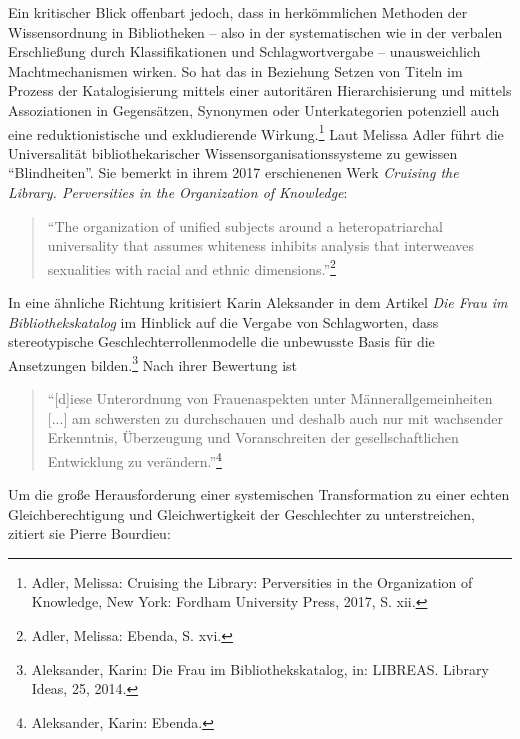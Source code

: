 \documentclass[a4paper,
fontsize=11pt,
oneside,
numbers=noperiodatend,
parskip=half-,
bibliography=totoc,
final
]{scrartcl}
\begin{document}
Ein kritischer Blick offenbart jedoch, dass in herkömmlichen Methoden
der Wissensordnung in Bibliotheken -- also in der systematischen wie in
der verbalen Erschließung durch Klassifikationen und Schlagwortvergabe
-- unausweichlich Machtmechanismen wirken. So hat das in Beziehung
Setzen von Titeln im Prozess der Katalogisierung mittels einer
autoritären Hierarchisierung und mittels Assoziationen in Gegensätzen,
Synonymen oder Unterkategorien potenziell auch eine reduktionistische
und exkludierende Wirkung.\footnote{Adler, Melissa: Cruising the
  Library: Perversities in the Organization of Knowledge, New York:
  Fordham University Press, 2017, S. xii.} Laut Melissa Adler führt die
Universalität bibliothekarischer Wissensorganisationssysteme zu gewissen
\enquote{Blindheiten}. Sie bemerkt in ihrem 2017 erschienenen Werk
\emph{Cruising the Library. Perversities in the Organization of
Knowledge}:

\begin{quote}
\enquote{The organization of unified subjects around a heteropatriarchal
universality that assumes whiteness inhibits analysis that interweaves
sexualities with racial and ethnic dimensions.}\footnote{Adler, Melissa:
  Ebenda, S. xvi.}
\end{quote}

In eine ähnliche Richtung kritisiert Karin Aleksander in dem Artikel
\emph{Die Frau im Bibliothekskatalog} im Hinblick auf die Vergabe von
Schlagworten, dass stereotypische Geschlechterrollenmodelle die
unbewusste Basis für die Ansetzungen bilden.\footnote{Aleksander, Karin:
  Die Frau im Bibliothekskatalog, in: LIBREAS. Library Ideas, 25, 2014.}
Nach ihrer Bewertung ist

\begin{quote}
\enquote{{[}d{]}iese Unterordnung von Frauenaspekten unter
Männerallgemeinheiten {[}...{]} am schwersten zu durchschauen und
deshalb auch nur mit wachsender Erkenntnis, Überzeugung und
Voranschreiten der gesellschaftlichen Entwicklung zu
verändern.}\footnote{Aleksander, Karin: Ebenda.}
\end{quote}

Um die große Herausforderung einer systemischen Transformation zu einer
echten Gleichberechtigung und Gleichwertigkeit der Geschlechter zu
unterstreichen, zitiert sie Pierre Bourdieu:
\end{document}
